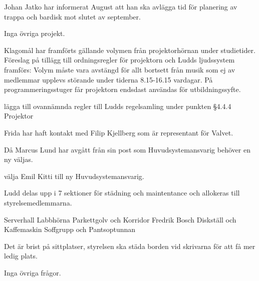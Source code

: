\documentclass{protokoll}
\begin{document}
Johan Jatko har informerat August att han ska avlägga tid för planering av trappa och bardisk mot slutet av september.

Inga övriga projekt.

Klagomål har framförts gällande volymen från projektorhörnan under studietider. Föreslag på tillägg till ordningsregler för projektorn och Ludds ljudssystem framförs: 
Volym måste vara avstängd för allt bortsett från musik som ej av medlemmar upplevs störande under tiderna 8.15-16.15 vardagar. 
På programmeringsstuger får projektorn endsdast användas för utbildningssyfte.

\begin{beslut}
    \att lägga till ovannämnda regler till Ludds regelsamling under punkten §4.4.4 Projektor
\end{beslut}

Frida har haft kontakt med Filip Kjellberg som är representant för Valvet.

Då Marcus Lund har avgått från sin post som Huvudsystemansvarig behöver en ny väljas. 
\begin{beslut}
    \att välja Emil Kitti till ny Huvudsystemansvarig.
\end{beslut}

Ludd delas upp i 7 sektioner för städning och maintentance och allokeras till styrelsemedlemmarna. 
\begin{list}
    \entry[Kitti] Serverhall 
    \entry[Jens] Labbhörna
    \entry[Frida] Parkettgolv och Korridor
    \entry[Plattform] Fredrik
    \entry[August] Bosch
    \entry[Anton] Diskställ och Kaffemaskin
    \entry[Edvin] Soffgrupp och Pantsoptunnan
\end{list}

Det är brist på sittplatser, styrelsen ska städa borden vid skrivarna för att få mer ledig plats.

Inga övriga frågor.
\end{document}
